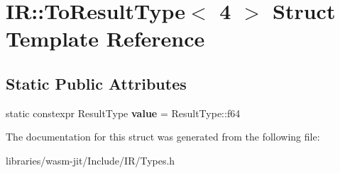 \hypertarget{struct_i_r_1_1_to_result_type_3_014_01_4}{}\section{IR\+:\+:To\+Result\+Type$<$ 4 $>$ Struct Template Reference}
\label{struct_i_r_1_1_to_result_type_3_014_01_4}
\subsection*{Static Public Attributes}
\begin{DoxyCompactItemize}
\item 
\mbox{\label{struct_i_r_1_1_to_result_type_3_014_01_4_aad507d7895c81a176ad5ad34f939c66d}} 
static constexpr Result\+Type {\bfseries value} = Result\+Type\+::f64
\end{DoxyCompactItemize}


The documentation for this struct was generated from the following file\+:\begin{DoxyCompactItemize}
\item 
libraries/wasm-\/jit/\+Include/\+I\+R/Types.\+h\end{DoxyCompactItemize}
